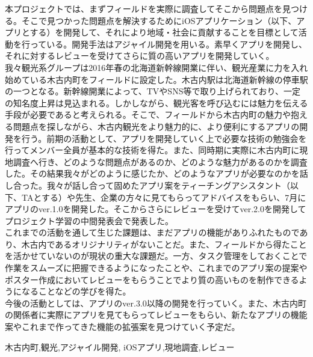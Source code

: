 \documentclass[openany,11pt,papersize]{jsbook}
\newcounter{hoge}
\newcommand{\fake}[1]{\whiledo{\thehoge<70}{#1\stepcounter{hoge}}%
  \setcounter{hoge}{0}}
\begin{document}
%
\maketitle

\frontmatter

\begin{jabstract}
\quad 本プロジェクトでは、まずフィールドを実際に調査してそこから問題点を見つける。そこで見つかった問題点を解決するためにiOSアプリケーション（以下、アプリとする）を開発して、それにより地域・社会に貢献することを目標として活動を行っている。開発手法はアジャイル開発を用いる。素早くアプリを開発し、それに対するレビューを受けてさらに質の高いアプリを開発していく。\\
\quad 我々観光系グループは2016年春の北海道新幹線開業に伴い、観光産業に力を入れ始めている木古内町をフィールドに設定した。木古内駅は北海道新幹線の停車駅の一つとなる。新幹線開業によって、TVやSNS等で取り上げられており、一定の知名度上昇は見込まれる。しかしながら、観光客を呼び込むには魅力を伝える手段が必要であると考えられる。そこで、フィールドから木古内町の魅力や抱える問題点を探しながら、木古内観光をより魅力的に、より便利にするアプリの開発を行う。前期の活動として、アプリを開発していく上で必要な技術の勉強会を行ってメンバー全員が基本的な技術を得た。また、同時期に実際に木古内町に現地調査へ行き、どのような問題点があるのか、どのような魅力があるのかを調査した。その結果我々がどのように感じたか、どのようなアプリが必要なのかを話し合った。我々が話し合って固めたアプリ案をティーチングアシスタント（以下、TAとする）や先生、企業の方々に見てもらってアドバイスをもらい、7月にアプリのver.1.0を開発した。そこからさらにレビューを受けてver.2.0を開発してプロジェクト学習の中間発表会で発表した。\\
\quad これまでの活動を通して生じた課題は、まだアプリの機能がありふれたものであり、木古内であるオリジナリティがないことだ。また、フィールドから得たことを活かせていないのが現状の重大な課題だ。一方、タスク管理をしておくことで作業をスムーズに把握できるようになったことや、これまでのアプリ案の提案やポスター作成においてレビューをもらうことでより質の高いものを制作できるようになることなどの学びを得た。\\
\quad 今後の活動としては、アプリのver.3.0以降の開発を行っていく。また、木古内町の関係者に実際にアプリを見てもらってレビューをもらい、新たなアプリの機能案やこれまで作ってきた機能の拡張案を見つけていく予定だ。

\begin{jkeyword}
木古内町,観光,アジャイル開発, iOSアプリ,現地調査,レビュー
\end{jkeyword}
\end{jabstract}
\end{document}
